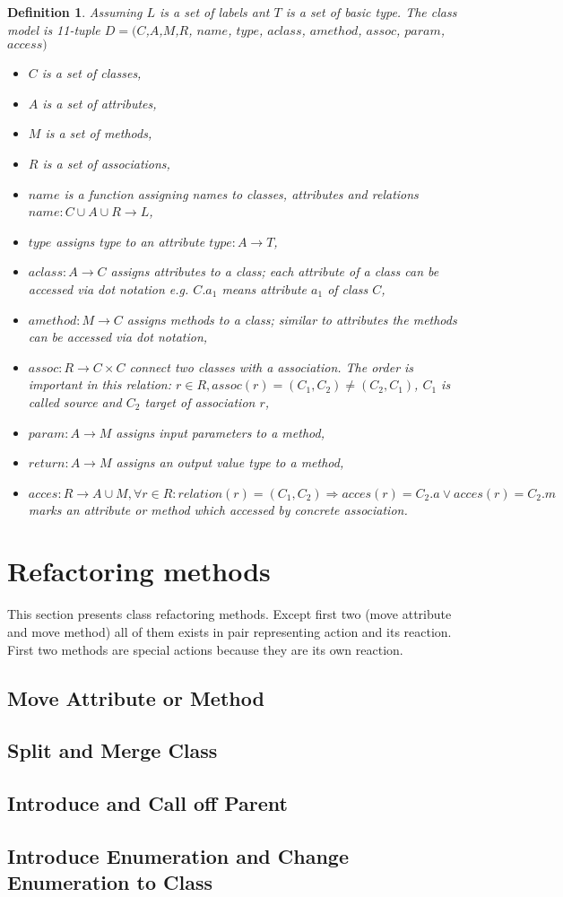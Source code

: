 \documentclass[10pt,a4paper]{article}
\newtheorem{mydef}{Definition}
\begin{document}
\begin{mydef}
\label{def:classModel}
Assuming $L$ is a set of labels ant $T$ is a set of basic type. The class model is 11-tuple 
$D = ( C$,$ A$,$ M$,$ R$, $name$, $type$, $aclass$, $amethod$, $assoc$, $param$, $access )$
\begin{itemize}
	\item $C$ is a set of classes,
	\item $A$ is a set of attributes,
	\item $M$ is a set of methods,
	\item $R$ is a set of associations,
	\item $name$ is a function assigning names to classes, attributes and relations $name: C \cup A \cup R \rightarrow L$,
	\item $type$ assigns type to an attribute $type: A \rightarrow T$,
	\item $aclass: A \rightarrow C$ assigns attributes to a class; each attribute of a class can be accessed via dot notation e.g. $C.a_1$ means attribute $a_1$ of class $C$,
	\item $amethod: M \rightarrow C$ assigns methods to a class; similar to attributes the methods can be accessed via dot notation,
	\item $assoc: R \rightarrow C \times C$ connect two classes with a association. The order is important in this relation: $r \in R, assoc(r)=(C_1, C_2) \neq (C_2, C_1)$, $C_1$ is called source and $C_2$ target of  association $r$,
	\item $param: A \rightarrow M$ assigns input parameters to a method,
	\item $return: A \rightarrow M$ assigns an output value type to a method,
	\item $acces: R \rightarrow A \cup M, \forall r \in R: relation(r)=(C_1,C_2)\Rightarrow acces(r)=C_2.a \vee acces(r)=C_2.m$ marks an attribute or method which accessed by concrete association. 
	\end{itemize}
\end{mydef}

\section{Refactoring methods}
This section presents class refactoring methods. Except first two (move attribute and move method) all of them exists in pair representing action and its reaction. First two methods are special actions because they are its own reaction.
\subsection{Move Attribute or Method}
\subsection{Split and Merge Class}
\subsection{Introduce and Call off Parent}
\subsection{Introduce Enumeration and Change Enumeration to Class}

 

\end{document}
